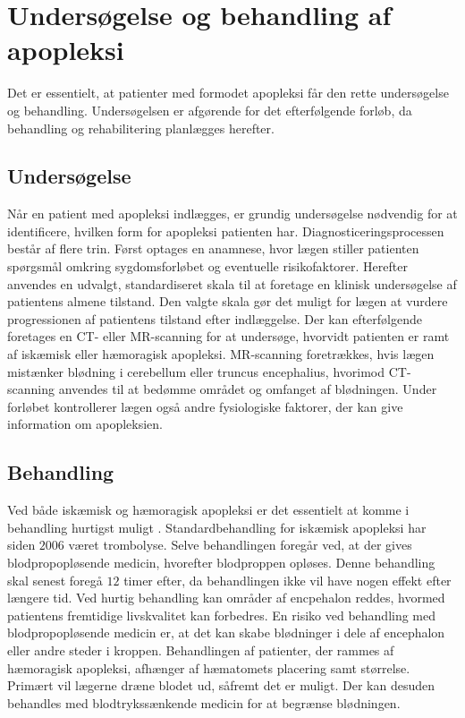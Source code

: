\section{Undersøgelse og behandling af apopleksi}
Det er essentielt, at patienter med formodet apopleksi får den rette undersøgelse og behandling. Undersøgelsen er afgørende for det efterfølgende forløb, da behandling og rehabilitering planlægges herefter. \cite{Sundhedsstyrelsen2009}

\subsection{Undersøgelse}
Når en patient med apopleksi indlægges, er grundig undersøgelse nødvendig for at identificere, hvilken form for apopleksi patienten har. 
Diagnosticeringsprocessen består af flere trin. Først optages en anamnese, hvor lægen stiller patienten spørgsmål omkring sygdomsforløbet og eventuelle risikofaktorer. Herefter anvendes en udvalgt, standardiseret skala til at foretage en klinisk undersøgelse af patientens almene tilstand. Den valgte skala gør det muligt for lægen at vurdere progressionen af patientens tilstand efter indlæggelse.
Der kan efterfølgende foretages en CT- eller MR-scanning for at undersøge, hvorvidt patienten er ramt af iskæmisk eller hæmoragisk apopleksi. MR-scanning foretrækkes, hvis lægen mistænker blødning i cerebellum eller truncus encephalius, hvorimod CT-scanning anvendes til at bedømme området og omfanget af blødningen. Under forløbet kontrollerer lægen også andre fysiologiske faktorer, der kan give information om apopleksien. \cite{Sundhedsstyrelsen2009,Schulze2011} 

\subsection{Behandling}
Ved både iskæmisk og hæmoragisk apopleksi er det essentielt at komme i behandling hurtigst muligt \cite{Soenderborg2013}.  
Standardbehandling for iskæmisk apopleksi har siden $2006$ været trombolyse. Selve behandlingen foregår ved, at der gives blodpropopløsende medicin, hvorefter blodproppen opløses. Denne behandling skal senest foregå $12$ timer efter, da behandlingen ikke vil have nogen effekt efter længere tid. Ved hurtig behandling kan områder af encpehalon reddes, hvormed patientens fremtidige livskvalitet kan forbedres. En risiko ved behandling med blodpropopløsende medicin er, at det kan skabe blødninger i dele af encephalon eller andre steder i kroppen. \cite{Hjernesagen2015b} Behandlingen af patienter, der rammes af hæmoragisk apopleksi, afhænger af hæmatomets placering samt størrelse. Primært vil lægerne dræne blodet ud, såfremt det er muligt. Der kan desuden behandles med blodtrykssænkende medicin for at begrænse blødningen. \cite{Caplan2006} 

